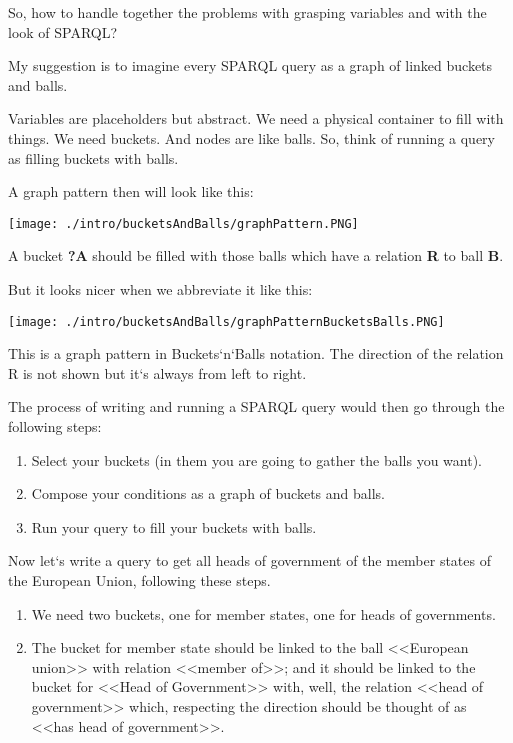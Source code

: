 So, how to handle together the problems with grasping variables and with the look of SPARQL?

My suggestion is to imagine every SPARQL query as a graph of linked buckets and balls.

Variables are placeholders but abstract. We need a physical container to fill with things. We need buckets. And nodes are like balls. So, think of running a query as filling buckets with balls.

A graph pattern then will look like this:

\begin{figure*}[h!]
    \texttt{[image: ./intro/bucketsAndBalls/graphPattern.PNG]}
\end{figure*}

A bucket \textbf{?A} should be filled with those balls which have a relation \textbf{R} to ball \textbf{B}.

But it looks nicer when we abbreviate it like this:

\begin{figure*}[h]
    \texttt{[image: ./intro/bucketsAndBalls/graphPatternBucketsBalls.PNG]}
\end{figure*}

This is a graph pattern in Buckets`n`Balls notation. The direction of the relation R is not shown but it`s always from left to right.

The process of writing and running a SPARQL query would then go through the following steps:

\begin{enumerate}
    \item Select your buckets (in them you are going to gather the balls you want).
    \item Compose your conditions as a graph of buckets and balls.
    \item Run your query to fill your buckets with balls.
\end{enumerate}

Now let`s write a query to get all heads of government of the member states of the European Union, following these steps.

\begin{enumerate}
    \item We need two buckets, one for member states, one for heads of governments.
    \item The bucket for member state should be linked to the ball <<European union>> with relation <<member of>>; and it should be linked to the bucket for <<Head of Government>> with, well, the relation <<head of government>> which, respecting the direction should be thought of as <<has head of government>>.
\end{enumerate}

